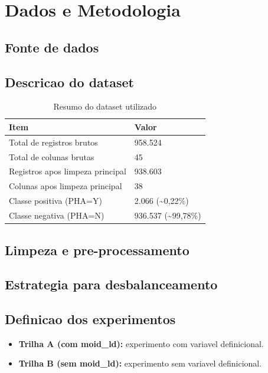 \documentclass[conference]{IEEEtran}
\begin{document}
\section{Dados e Metodologia}
\subsection{Fonte de dados}

\subsection{Descricao do dataset}
\begin{table}[!t]
\centering
\caption{Resumo do dataset utilizado}
\begin{tabular}{ll}
\toprule
Item & Valor \\
\midrule
Total de registros brutos & 958.524 \\
Total de colunas brutas & 45 \\
Registros apos limpeza principal & 938.603 \\
Colunas apos limpeza principal & 38 \\
Classe positiva (PHA=Y) & 2.066 (\~{}0,22\%) \\
Classe negativa (PHA=N) & 936.537 (\~{}99,78\%) \\
\bottomrule
\end{tabular}
\label{tab:dataset_resumo}
\end{table}

\subsection{Limpeza e pre-processamento}

\subsection{Estrategia para desbalanceamento}

\subsection{Definicao dos experimentos}
\begin{itemize}[leftmargin=*]
    \item \textbf{Trilha A (com moid\_ld):} experimento com variavel definicional.
    \item \textbf{Trilha B (sem moid\_ld):} experimento sem variavel definicional.
\end{itemize}
\end{document}
